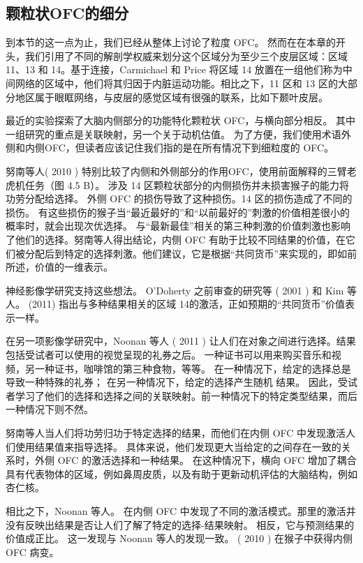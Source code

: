 \subsection{颗粒状OFC的细分}
到本节的这一点为止，我们已经从整体上讨论了粒度 OFC。 然而在在本章的开头，我们引用了不同的解剖学权威来划分这个区域分为至少三个皮层区域：区域 11、13 和 14。基于连接，Carmichael 和 Price 将区域 14 放置在一组他们称为中间网络的区域中，他们将其归因于内脏运动功能。相比之下，11 区和 13 区的大部分地区属于眼眶网络，与皮层的感觉区域有很强的联系，比如下颞叶皮层。\par
最近的实验探索了大脑内侧部分的功能特化颗粒状 OFC，与横向部分相反。 其中一组研究的重点是关联映射，另一个关于动机估值。 为了方便，我们使用术语外侧和内侧OFC，但读者应该记住我们指的是在所有情况下到细粒度的 OFC。\par
努南等人( 2010 ) 特别比较了内侧和外侧部分的作用OFC，使用前面解释的三臂老虎机任务（图 4.5 B）。 涉及 14 区颗粒状部分的内侧损伤并未损害猴子的能力将功劳分配给选择。 外侧 OFC 的损伤导致了这种损伤。14 区的损伤造成了不同的损伤。 有这些损伤的猴子当“最近最好的”和“以前最好的”刺激的价值相差很小的概率时，就会出现次优选择。 与“最新最佳”相关的第三种刺激的价值刺激也影响了他们的选择。努南等人得出结论，内侧 OFC 有助于比较不同结果的价值，在它们被分配后到特定的选择刺激。他们建议，它是根据“共同货币”来实现的，即如前所述，价值的一维表示。\par
神经影像学研究支持这些想法。 O'Doherty 之前审查的研究等 ( 2001 ) 和 Kim 等人。 (2011) 指出与多种结果相关的区域 14的激活，正如预期的“共同货币”价值表示一样。\par
在另一项影像学研究中，Noonan 等人 ( 2011 ) 让人们在对象之间进行选择。结果包括受试者可以使用的视觉呈现的礼券之后。 一种证书可以用来购买音乐和视频，另一种证书，咖啡馆的第三种食物，等等。 在一种情况下，给定的选择总是导致一种特殊的礼券； 在另一种情况下，给定的选择产生随机
结果。 因此，受试者学习了他们的选择和选择之间的关联映射。前一种情况下的特定类型结果，而后一种情况下则不然。\par
努南等人当人们将功劳归功于特定选择的结果，而他们在内侧 OFC 中发现激活人们使用结果值来指导选择。 具体来说，他们发现更大当给定的之间存在一致的关系时，外侧 OFC 的激活选择和一种结果。 在这种情况下，横向 OFC 增加了耦合具有代表物体的区域，例如鼻周皮质，以及有助于更新动机评估的大脑结构，例如杏仁核。\par
相比之下，Noonan 等人。 在内侧 OFC 中发现了不同的激活模式。那里的激活并没有反映出结果是否让人们了解了特定的选择-结果映射。 相反，它与预测结果的价值成正比。 这一发现与 Noonan 等人的发现一致。 ( 2010 ) 在猴子中获得内侧 OFC 病变。\par
